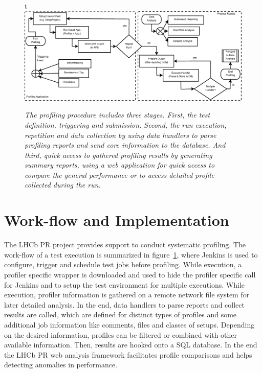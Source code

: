 \documentclass[a4paper]{jpconf}
\begin{document}
\begin{figure}{t}
\includegraphics[scale=0.3]{figures/profiling_process.eps}
\caption{\small \textit{The profiling procedure includes three stages. First, the test definition, triggering and submission. Second, the run execution, repetition and data collection by using data handlers to parse profiling reports and send core information to the database. And third, quick access to gathered profiling results by generating summary reports, using a web application for quick access to compare the general performance or to access detailed profile collected during the run.}}
\label{fig:profiling_process}
\end{figure}

\section{Work-flow and Implementation}
\label{sec:workflow_and_implementation}

The LHCb PR project provides support to conduct systematic profiling. The work-flow of a test execution is summarized in \mbox{figure \ref{fig:profiling_process}}, where Jenkins is used to configure, trigger and schedule test jobs before profiling. While execution, a profiler specific wrapper is downloaded and used to hide the profiler specific call for Jenkins and to setup the test environment for multiple executions. While execution, profiler information is gathered on a remote network file system for later detailed analysis. In the end, data handlers to parse reports and collect results are called, which are defined for distinct types of profiles and some additional job information like comments, files and classes of setups. Depending on the desired information, profiles can be filtered or combined with other available information. Then, results are hooked onto a SQL database. In the end the LHCb PR web analysis framework facilitates profile comparisons and helps detecting anomalies in performance.
\end{document}
